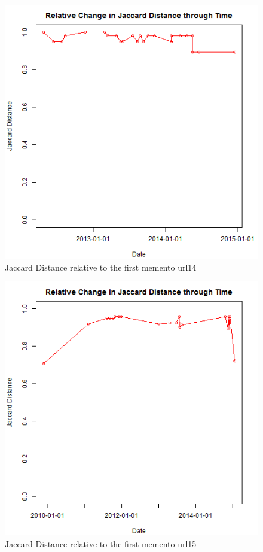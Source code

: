 \begin{figure}[ht]
	\begin{center}
		 \includegraphics[scale=0.60]{url14}
		  \caption{Jaccard Distance relative to the first memento url14}
	 \end{center}
\end{figure}
\begin{figure}[ht]
	\begin{center}
		 \includegraphics[scale=0.60]{url15}
		  \caption{Jaccard Distance relative to the first memento url15}
	 \end{center}
\end{figure}

